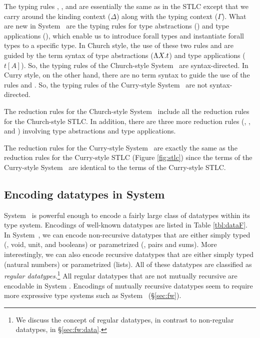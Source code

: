 The typing rules , , and  are 
essentially the same as in the STLC except that we carry around
the kinding context ($\Delta$) along with the typing context ($\Gamma$).
What are new in System \F\ are the typing rules for type abstractions
() and type applications (), which enable
us to introduce forall types and instantiate forall types to a specific type.
In Church style, the use of these two rules  and
 are guided by the term syntax of type abstractions
($\Lambda X.t$) and type applications ($t[A]$). So, the typing rules of
the Church-style System \F\ are syntax-directed. In Curry style,
on the other hand, there are no term syntax to guide the use of the rules
 and . So, the typing rules of
the Curry-style System \F\ are not syntax-directed.

The reduction rules for the Church-style System \F\ include all
the reduction rules for the Church-style STLC. In addition,  there
are three more reduction rules (, ,
and ) involving type abstractions and type applications.

The reduction rules for the Curry-style System \F\ are exactly the same as
the reduction rules for the Curry-style STLC (Figure \ref{fig:stlc}) since
the terms of the Curry-style System \F\ are identical to 
the terms of the Curry-style STLC.

\subsection{Encoding datatypes in System \F}
\label{sec:f:data}
System \F\ is  powerful enough to encode a fairly large class of datatypes
within its type system. Encodings of well-known datatypes are listed in
Table \ref{tbl:dataF}. In System~\F, we can encode non-recursive datatypes
that are either simply typed (\eg, void, unit, and booleans)
or parametrized (\eg, pairs and sums).
More interestingly, we can also encode recursive datatypes
that are either simply typed (natural numbers) or parametrized (lists).
All of these datatypes are classified as \emph{regular datatypes}.\footnote{
        We discuss the concept of regular datatypes,
        in contrast to non-regular datatypes, in \S\ref{sec:fw:data}. }
All regular datatypes that are not mutually recursive are encodable
in System \F. Encodings of mutually recursive datatypes seem to require
more expressive type systems such as System \Fw\ (\S\ref{sec:fw}).

